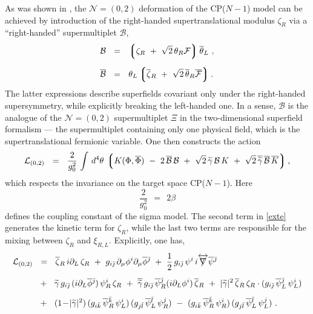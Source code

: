 \documentclass[12pt]{article}
\def\beq{\begin{equation}}
\def\eeq{\end{equation}}
\newcommand{\ntwoo}{${\mathcal N}= \left(0,2\right) $ }
\newcommand{\p}{\partial}
\newcommand{\wt}{\widetilde}
\newcommand{\ov}{\overline}
\newcommand{\mc}[1]{\mathcal{#1}}
\newcommand{\lgr}{\left\lgroup}
\newcommand{\rgr}{\right\rgroup}
\def\slashed#1{\setbox0=\hbox{$#1$}             %
   \dimen0=\wd0                                 %
   \setbox1=\hbox{/} \dimen1=\wd1               %
   \ifdim\dimen0>\dimen1                        %
      \rlap{\hbox to \dimen0{\hfil/\hfil}}      %
      #1                                        %
   \else                                        %
      \rlap{\hbox to \dimen1{\hfil$#1$\hfil}}   %
      /                                         %
   \fi}                                        %
\newcommand{\bzr}{\ov{\zeta}{}_R}
\newcommand{\zr}{\zeta_R}
\newcommand{\tgamma}{\wt{\gamma}}
\begin{document}
	As was shown in \cite{SYhet},  the \ntwoo deformation of the CP($N-1$) model can be achieved by
	introduction of the right-handed supertranslational modulus $ \zeta_R $ via a ``right-handed'' 
	supermultiplet $ \mc{B} $,
\begin{align*}
%
	\mc{B} & ~~=~~ \lgr \zr ~+~ \sqrt{2}\,\theta_R\mc{F} \rgr \ov{\theta}{}_L~, \\[2mm]
%
	\ov{\mc{B}} & ~~=~~ \theta_L \lgr \bzr ~+~ \sqrt{2}\, \ov{\theta}{}_R \ov{\mc{F}} \rgr.
\end{align*}
	The latter expressions describe superfields covariant only under the right-handed supersymmetry, 
	while explicitly breaking the left-handed one.
	In a sense, $ \mc{B} $ is the analogue of the \ntwoo supermultiplet $\Xi$ in the two-dimensional 
	superfield formalism \cite{Edalati} ---
	the supermultiplet containing only one physical field, which is the supertranslational
	fermionic variable.
	One then constructs the action 
\beq
\label{exte}
	\mc{L}_{(0,2)} ~~=~~ \frac{2}{g_0^2}\, \int\, d^4\theta\, \lgr K(\Phi,\ov{\Phi}) 
		~-~ 2\, \ov{\mc{B}}\,\mc{B}  ~+~  \sqrt{2}\,\tgamma\,\mc{B}\,K  
					     ~+~ \sqrt{2}\,\ov{\tgamma}\,\ov{\mc{B}}\,\ov{K} \rgr,
\eeq
	which respects the invariance on the target space CP($N-1$).
	Here
\[
	\frac{2}{g_0^2} ~~=~~ 2\beta
\]
	defines the coupling constant of the sigma model.
	The second term in \eqref{exte} generates the kinetic term for $ \zr $, while the last two terms 
	are responsible for the mixing between $ \zr $ and $ \xi_{R,L} $.
	Explicitly, one has,
\begin{align}
%
\notag
	\mc{L}_{(0,2)} & ~~=~~  \bzr\, i\p_L\, \zr 
			~+~ g_{i\bj}\,\p_\mu \phi^i \p_\mu\ov{\phi}{}^\bj
			~+~ \frac{1}{2}\, g_{i\bj}\, \psi^i\, i\overleftrightarrow{\slashed{\nabla}} \ov{\psi}{}^\bj 
	\\[2mm]
%
\label{cpn-1g}
			& 
			~~+~~ \tgamma\, g_{i\bj}\, (i \p_L \ov{\phi}{}^\bj)\, \psi_R^i\, \zr
			~+~ \ov{\tgamma}\, g_{i\bj}\, \ov{\psi}{}_R^\bj (i \p_L \phi^i)\, \bzr
			~+~ |\tgamma|^2\, \bzr\,\zr \cdot ( g_{i\bj}\, \ov{\psi}{}_L^\bj\, \psi_L^i )
	\\[2mm]
%
\notag
			& 
			~~+~~ (1 \!-\! |\tgamma|^2)\, (g_{i\bk}\, \ov{\psi}{}_R^\bk\, \psi_L^i)\,
						     (g_{j\bl}\, \ov{\psi}{}_L^\bl\, \psi_R^j)
			~-~ (g_{i\bk}\, \ov{\psi}{}_R^\bk\, \psi_R^i)\, (g_{j\bl}\, \ov{\psi}{}_L^\bl\, \psi_L^j)~.
\end{align}
	
\end{document}

